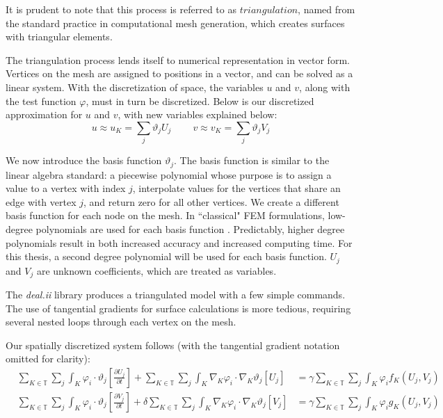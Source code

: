 \documentclass[12pt]{article}
\begin{document}

It is prudent to note that this process is referred to as $triangulation$, named from the standard practice in computational mesh generation, which creates surfaces with triangular elements. 




The triangulation process lends itself to numerical representation in vector form. Vertices on the mesh are assigned to positions in a vector, and can be solved as a linear system. With the discretization of space, the variables $u$ and $v$, along with the test function $\varphi$, must in turn be discretized. Below is our discretized approximation for $u$ and $v$, with new variables explained below:
\begin{equation}
u \approx u_K = \sum_j\vartheta_j U_j ~~~~~~~~~~ v \approx v_K = \sum_j\vartheta_j V_j
\end{equation}

We now introduce the basis function $\vartheta_j$. The basis function is similar to the linear algebra standard: a piecewise polynomial whose purpose is to assign a value to a vertex with index $j$, interpolate values for the vertices that share an edge with vertex $j$, and return zero for all other vertices. We create a different basis function for each node on the mesh. In ``classical" FEM formulations, low-degree polynomials are used for each basis function \cite{Tuncer2015}. Predictably, higher degree polynomials result in both increased accuracy and increased computing time. For this thesis, a second degree polynomial will be used for each basis function. $U_j$ and $V_j$ are unknown coefficients, which are treated as variables.

The \textit{deal.ii} library produces a triangulated model with a few simple commands. The use of tangential gradients for surface calculations is more tedious, requiring several nested loops through each vertex on the mesh. 

Our spatially discretized system follows (with the tangential gradient notation omitted for clarity):
\begin{equation}
\begin{aligned}
&\sum_{K\in\mathbb{T}}\sum_j 
\int_K \varphi_i\cdot\vartheta_j\left[\frac{\partial U_j}{\partial t}\right] + 
\sum_{K\in\mathbb{T}}\sum_j
\int_K \nabla_K\varphi_i\cdot\nabla_K \vartheta_j \left[U_j\right] &= 
\gamma\sum_{K\in\mathbb{T}}\sum_j
\int_K \varphi_i f_K(U_j,V_j) \\
&\sum_{K\in\mathbb{T}}\sum_j
\int_K \varphi_i\cdot\vartheta_j\left[\frac{\partial V_j}{\partial t}\right] + 
\delta\sum_{K\in\mathbb{T}}\sum_j
\int_K \nabla_K\varphi_i\cdot\nabla_K \vartheta_j \left[V_j\right] &=
\gamma\sum_{K\in\mathbb{T}}\sum_j
\int_K \varphi_i g_K(U_j,V_j)
\end{aligned}
\end{equation}
\end{document}
